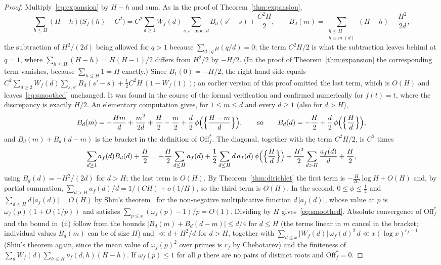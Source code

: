 \documentclass[11pt,a4paper]{article}
\theoremstyle{remark}\newtheorem{remark}[theorem]{Remark}
\begin{document}
\begin{proof}
Multiply~\eqref{eq:expansion} by $H-h$ and sum. As in the proof of Theorem~\ref{thm:expansion},
\[
\sum_{h\le H}(H-h)\bigl(S_f(h)-C^2\bigr)=C^2\sum_{d\ge1}W_f(d)\sum_{s,s'\bmod d}B_d(s'-s)+\frac{C^2H}2,\qquad
B_d(m)=\sum_{\substack{h\le H\\h\equiv m\ (d)}}(H-h)-\frac{H^2}{2d},
\]
the subtraction of $H^2/(2d)$ being allowed for $q>1$ because $\sum_{d\mid q}\mu(q/d)=0$; the term
$C^2H/2$ is what the subtraction leaves behind at $q=1$, where $\sum_{h\le H}(H-h)=H(H-1)/2$ differs
from $H^2/2$ by $-H/2$. (In the proof of Theorem~\ref{thm:expansion} the corresponding term vanishes,
because $\sum_{h\le H}1=H$ exactly.) Since $B_1(0)=-H/2$, the right-hand side equals
$C^2\sum_{d\ge2}W_f(d)\sum_{s,s'}B_d(s'-s)+\tfrac12C^2H\,(1-W_f(1))$; an earlier version of this proof
omitted the last term, which is $O(H)$ and leaves~\eqref{eq:smoothed} unchanged. It was found in the
course of the formal verification and confirmed numerically for $f(t)=t$, where the discrepancy is
exactly $H/2$. An elementary
computation gives, for $1\le m\le d$ and every $d\ge1$ (also for $d>H$),
\[
B_d(m)=-\frac{Hm}d+\frac{m^2}{2d}+\frac H2-\frac m2+\frac d2\,\phi\Bigl(\Bigl\{\frac{H-m}d\Bigr\}\Bigr),
\qquad\text{so}\qquad
B_d(d)=-\frac H2+\frac d2\,\phi\Bigl(\Bigl\{\frac Hd\Bigr\}\Bigr),
\]
and $B_d(m)+B_d(d-m)$ is the bracket in the definition of $\mathrm{Off}^\ast_f$. The diagonal,
together with the term $C^2H/2$, is $C^2$ times
\[
\sum_{d\ge1}a_f(d)B_d(d)+\frac H2=-\frac H2\sum_{d\le H}a_f(d)+\frac12\sum_{d\le H}d\,a_f(d)\,\phi\Bigl(\Bigl\{\frac Hd\Bigr\}\Bigr)-\frac{H^2}2\sum_{d>H}\frac{a_f(d)}d+\frac H2,
\]
using $B_d(d)=-H^2/(2d)$ for $d>H$; the last term is $O(H)$. By Theorem~\ref{thm:dirichlet} the first term is
$-\frac{H}{2C}\log H+O(H)$ and, by partial summation, $\sum_{d>H}a_f(d)/d=1/(CH)+o(1/H)$, so the third
term is $O(H)$. In the second, $0\le\phi\le\tfrac14$ and $\sum_{d\le H}d\,|a_f(d)|=O(H)$ by Shiu's
theorem~\cite{Shiu1980} for the non-negative multiplicative function $d\,|a_f(d)|$, whose value at $p$
is $\omega_f(p)(1+O(1/p))$ and satisfies $\sum_{p\le x}(\omega_f(p)-1)/p=O(1)$. Dividing by $H$
gives~\eqref{eq:smoothed}. Absolute convergence of $\mathrm{Off}^\ast_f$ and the bound in~(ii) follow
from the bounds $|B_d(m)+B_d(d-m)|\le d/4$ for $d\le H$ (the terms linear in $m$ cancel in the bracket;
individual values $B_d(m)$ can be of size $H$) and $\ll d+H^2/d$ for $d>H$, together with
$\sum_{d\le x}|W_f(d)|\,\omega_f(d)^2\,d\ll x(\log x)^{r_f-1}$ (Shiu's theorem again, since the mean
value of $\omega_f(p)^2$ over primes is $r_f$ by Chebotarev) and the finiteness of
$\sum_d W_f(d)\sum_{h\le H}\nu_f(d,h)(H-h)$. If $\omega_f(p)\le1$ for all $p$ there are no pairs of
distinct roots and $\mathrm{Off}^\ast_f=0$.
\end{proof}
\end{document}
